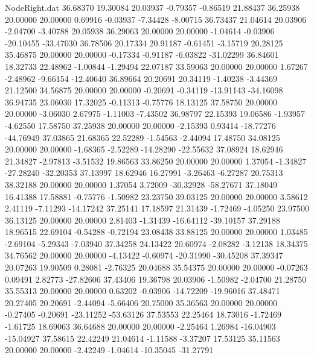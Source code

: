 \begin{filecontents}{NodeRight.dat}
  36.68370   19.30084   20.03937    -0.79357   -0.86519   21.88437   36.25938   20.00000   20.00000    0.69916   -0.03937   -7.34428   -8.00715
  36.73437   21.04614   20.03906    -2.04700   -3.40788   20.05938   36.29063   20.00000   20.00000   -1.04614   -0.03906  -20.10455  -33.47030
  36.78506   20.17334   20.91187    -0.61451   -3.15719   20.28125   35.46875   20.00000   20.00000   -0.17334   -0.91187   -6.03822  -31.02299
  36.84601   18.32733   22.48962    -1.00844   -1.29494   22.07187   33.59063   20.00000   20.00000    1.67267   -2.48962   -9.66154  -12.40640
  36.89664   20.20691   20.34119    -1.40238   -3.44369   21.12500   34.56875   20.00000   20.00000   -0.20691   -0.34119  -13.91143  -34.16098
  36.94735   23.06030   17.32025    -0.11313   -0.75776   18.13125   37.58750   20.00000   20.00000   -3.06030    2.67975   -1.11003   -7.43502
  36.98797   22.15393   19.06586    -1.93957   -4.62550   17.58750   37.25938   20.00000   20.00000   -2.15393    0.93414  -18.77276  -44.76949
  37.03865   21.68365   22.52289    -1.54563   -2.44094   17.48750   34.08125   20.00000   20.00000   -1.68365   -2.52289  -14.28290  -22.55632
  37.08924   18.62946   21.34827    -2.97813   -3.51532   19.86563   33.86250   20.00000   20.00000    1.37054   -1.34827  -27.28240  -32.20353
  37.13997   18.62946   16.27991    -3.26463   -6.27287   20.75313   38.32188   20.00000   20.00000    1.37054    3.72009  -30.32928  -58.27671
  37.18049   16.41388   17.58881    -0.75776   -1.50982   23.23750   39.03125   20.00000   20.00000    3.58612    2.41119   -7.11293  -14.17242
  37.25141   17.18597   21.31439    -1.72469   -4.05250   23.97500   36.13125   20.00000   20.00000    2.81403   -1.31439  -16.64112  -39.10157
  37.29188   18.96515   22.69104    -0.54288   -0.72194   23.08438   33.88125   20.00000   20.00000    1.03485   -2.69104   -5.29343   -7.03940
  37.34258   24.13422   20.60974    -2.08282   -3.12138   18.34375   34.76562   20.00000   20.00000   -4.13422   -0.60974  -20.31990  -30.45208
  37.39347   20.07263   19.90509     0.28081   -2.76325   20.04688   35.54375   20.00000   20.00000   -0.07263    0.09491    2.82773  -27.82606
  37.43406   19.36798   20.03906    -1.50982   -2.04700   21.28750   35.55313   20.00000   20.00000    0.63202   -0.03906  -14.72209  -19.96016
  37.48471   20.27405   20.20691    -2.44094   -5.66406   20.75000   35.36563   20.00000   20.00000   -0.27405   -0.20691  -23.11252  -53.63126
  37.53553   22.25464   18.73016    -1.72469   -1.61725   18.69063   36.64688   20.00000   20.00000   -2.25464    1.26984  -16.04903  -15.04927
  37.58615   22.42249   21.04614    -1.11588   -3.37207   17.53125   35.11563   20.00000   20.00000   -2.42249   -1.04614  -10.35045  -31.27791

\end{filecontents}
